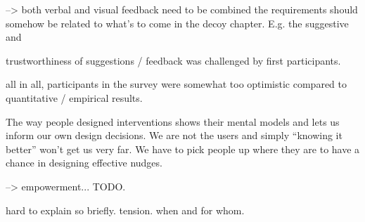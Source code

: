 --> both verbal and visual feedback need to be combined
the requirements should somehow be related to what's to come in the decoy chapter. E.g. the suggestive and 

trustworthiness of suggestions / feedback was challenged by first participants.


all in all, participants in the survey were somewhat too optimistic compared to quantitative / empirical results.

The way people designed interventions shows their mental models and lets us inform our own design decisions. We are not the users and simply ``knowing it better'' won't get us very far. We have to pick people up where they are to have a chance in designing effective nudges. 

--> empowerment... TODO.

hard to explain so briefly. tension. when and for whom. 


\vspace*{1cm}\noindent
{}


